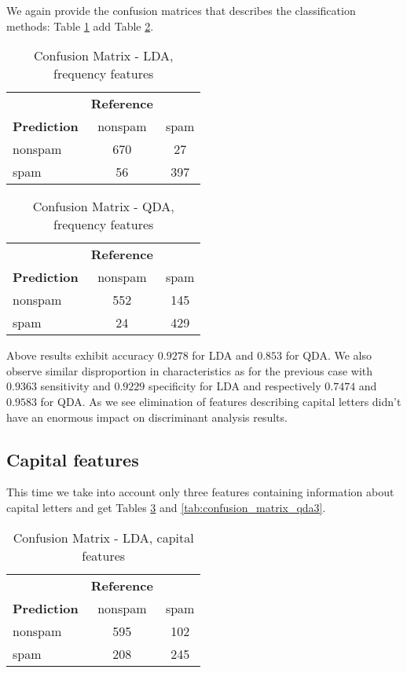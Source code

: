 \documentclass[12pt, letter paper]{article}
\begin{document}
	We again provide the confusion matrices that describes the classification methods: Table \ref{tab:confusion_matrix_lda2} add Table \ref{tab:confusion_matrix_qda2}.
	
	\begin{table}[h]
		\centering
		\begin{tabular}{lcc}
			& \textbf{Reference} & \\
			\textbf{Prediction} & nonspam & spam \\
			nonspam & 670 & 27 \\
			spam & 56 & 397 \\
		\end{tabular}
		\caption{Confusion Matrix - LDA, frequency features}
		\label{tab:confusion_matrix_lda2}
	\end{table}
	
	\begin{table}[h]
		\centering
		\begin{tabular}{lcc}
			& \textbf{Reference} & \\
			\textbf{Prediction} & nonspam & spam \\
			nonspam & 552 & 145 \\
			spam & 24 & 429 \\
		\end{tabular}
		\caption{Confusion Matrix - QDA, frequency features}
		\label{tab:confusion_matrix_qda2}
	\end{table}
	
	Above results exhibit accuracy $0.9278$ for LDA and $0.853$ for QDA. We also observe similar disproportion in characteristics as for the previous case with $0.9363$ sensitivity and $0.9229$ specificity for LDA and respectively $0.7474$ and $0.9583$ for QDA. As we see elimination of features describing capital letters didn't have an enormous impact on discriminant analysis results.
	
	\subsection*{Capital features}
	
	 This time we take into account only three features containing information about capital letters and get Tables \ref{tab:confusion_matrix_lda3} and \ref{tab:confusion_matrix_qda3}.
	\begin{table}[h]
		\centering
		\begin{tabular}{lcc}
			& \textbf{Reference} & \\
			\textbf{Prediction} & nonspam & spam \\
			nonspam & 595 & 102 \\
			spam & 208 & 245 \\
		\end{tabular}
		\caption{Confusion Matrix - LDA, capital features}
		\label{tab:confusion_matrix_lda3}
	\end{table}
	
\end{document}
